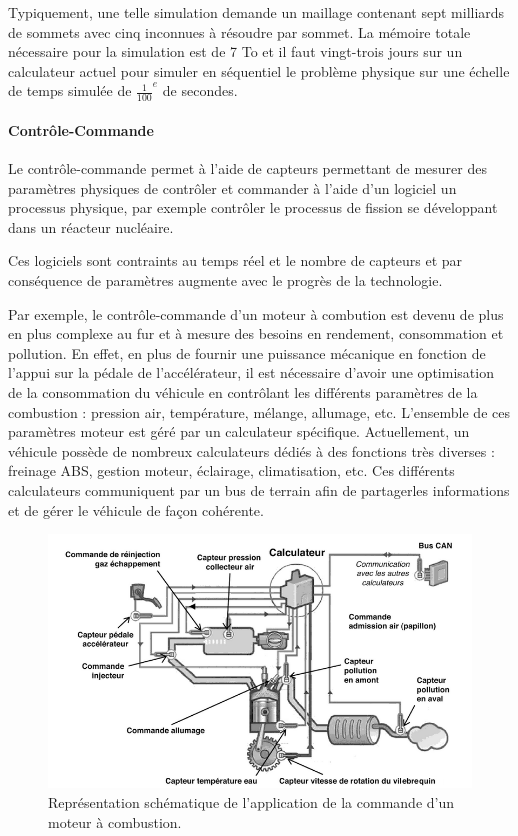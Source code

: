 \documentclass[fleqn,11pt]{article}
\begin{document}
Typiquement, une telle simulation demande un maillage contenant sept milliards de sommets avec cinq inconnues à résoudre
par sommet. La mémoire totale nécessaire pour la simulation est de 7 To et il faut vingt-trois jours sur un calculateur actuel
pour simuler en séquentiel le problème physique sur une échelle de temps simulée de ${\frac{1}{100}}^{e}$ de secondes.

\paragraph{Contrôle-Commande}

Le contrôle-commande permet à l'aide de capteurs permettant de mesurer des paramètres physiques de contrôler et commander à l'aide d'un logiciel un processus physique, par exemple contrôler le processus de fission se développant dans un réacteur nucléaire. 

Ces logiciels sont contraints au temps réel et le nombre de capteurs et par conséquence de paramètres augmente avec le progrès de la technologie.

Par exemple, le contrôle-commande d'un moteur à combution est devenu de plus en plus complexe au fur et à mesure des besoins en rendement, consommation et pollution. En effet, en plus de fournir une puissance mécanique en fonction de l'appui sur la pédale de l'accélérateur,  il est nécessaire d'avoir une optimisation de la consommation du véhicule en contrôlant les différents paramètres de la combustion : pression air, température, mélange,  allumage, etc. L'ensemble de ces paramètres moteur est géré par un calculateur spécifique. Actuellement,  un véhicule possède de nombreux calculateurs dédiés à des fonctions très diverses : freinage ABS, gestion moteur, éclairage,  climatisation, etc. Ces différents calculateurs communiquent par un bus de terrain afin de partagerles informations et de gérer le véhicule de façon cohérente.

\begin{figure}[h]
\includegraphics[width=\textwidth]{ControleCommande}
\caption{Représentation schématique de l'application de la commande d'un moteur à combustion.}
\end{figure}
\end{document}
